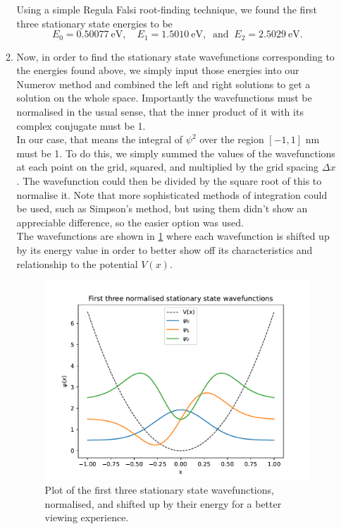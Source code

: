 \documentclass[11pt]{article}
\begin{document}
\begin{enumerate}
\begin{enumerate}
        Using a simple Regula Falsi root-finding technique, we found the first three stationary state energies to be 
        \begin{equation*}
            E_0=\SI{0.50077}{\electronvolt},\quad E_1=\SI{1.5010}{\electronvolt},\;\;\mathrm{and}\;\; E_2=\SI{2.5029}{\electronvolt}.
        \end{equation*}
        
        \item Now, in order to find the stationary state wavefunctions corresponding to the energies found above, we simply input those energies into our Numerov method and combined the left and right solutions to get a solution on the whole space. Importantly the wavefunctions must be normalised in the usual sense, that the inner product of it with its complex conjugate must be 1.\\
        In our case, that means the integral of $\psi^2$ over the region $[-1,1]$ nm must be 1. To do this, we simply summed the values of the wavefunctions at each point on the grid, squared, and multiplied by the grid spacing $\Delta x$. The wavefunction could then be divided by the square root of this to normalise it. Note that more sophisticated methods of integration could be used, such as Simpson's method, but using them didn't show an appreciable difference, so the easier option was used.\\
        The wavefunctions are shown in \cref{fig:q2b} where each wavefunction is shifted up by its energy value in order to better show off its characteristics and relationship to the potential $V(x)$. 


        \begin{figure}[h]
            \begin{center}
                \includegraphics[width=.6\textwidth]{Plots/q2b.pdf}
                \caption{Plot of the first three stationary state wavefunctions, normalised, and shifted up by their energy for a better viewing experience. }
                \label{fig:q2b}
            \end{center}
        \end{figure}
        

\end{enumerate}
\end{enumerate}
\end{document}

